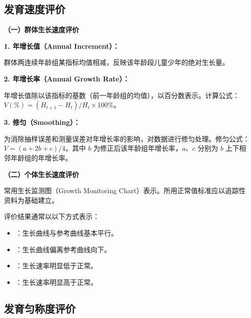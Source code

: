\subsection{发育速度评价}

\begin{keybox}
\textbf{（一）群体生长速度评价}

\textbf{1. 年增长值（Annual Increment）：}

群体两连续年龄组某指标均值相减，反映该年龄段儿童少年的绝对生长量。

\textbf{2. 年增长率（Annual Growth Rate）：}

年增长值除以该指标的基数（前一年龄组的均值），以百分数表示。计算公式：$V(\%) = (H_{t+1} - H_t) / H_t \times 100\%$。

\textbf{3. 修匀（Smoothing）：}

为消除抽样误差和测量误差对年增长率的影响，对数据进行修匀处理。修匀公式：$V = (a + 2b + c) / 4$，其中 $b$ 为修正后该年龄组年增长率，$a$、$c$ 分别为 $b$ 上下相邻年龄组的年增长率。

\textbf{（二）个体生长速度评价}

常用生长监测图（Growth Monitoring Chart）表示。所用正常值标准应以追踪性资料为基础建立。

评价结果通常以以下方式表示：
\begin{itemize}[leftmargin=*]
    \item {}：生长曲线与参考曲线基本平行。
    \item {}：生长曲线偏离参考曲线向下。
    \item {}：生长速率明显低于正常。
    \item {}：生长速率明显高于正常。
\end{itemize}
\end{keybox}

\subsection{发育匀称度评价}

